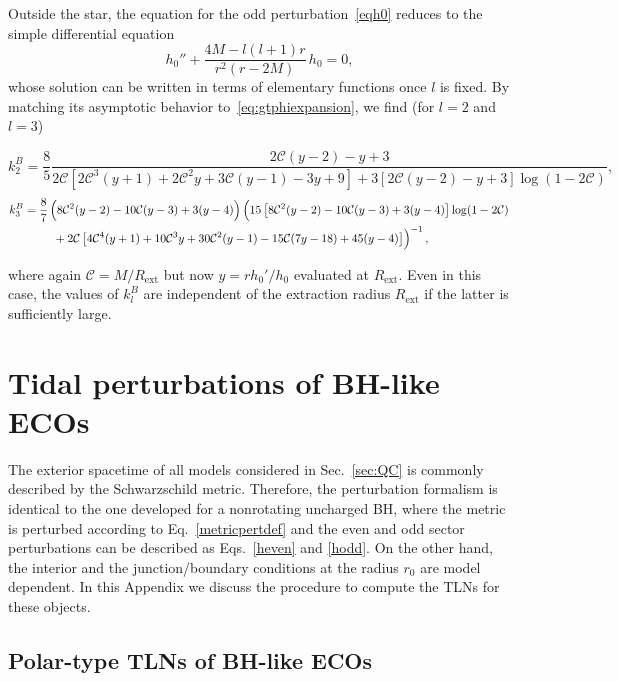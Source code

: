 \documentclass[aps,twocolumn,showpacs,preprintnumbers,nofootinbib,prd,superscriptaddress,groupedaddress,10pt]{revtex4-1}
\def\be{\begin{equation}}
\def\ee{\end{equation}}
\newcommand{\beq}{\begin{eqnarray}}
\newcommand{\eeq}{\end{eqnarray}}
\newcommand{\C}{\mathcal{C}}
\begin{document}
Outside the star, the equation for the odd perturbation~\eqref{eqh0} reduces to the simple differential equation
\be%
h_0'' + \frac{4M - l(l+1)r}{r^2 (r-2M)}\,h_0 = 0,
\ee%
whose solution can be written in terms of elementary functions once $l$ is fixed.
%
By matching its asymptotic behavior to~\eqref{eq:gtphiexpansion}, we find  (for $l=2$ and $l=3$)
\begin{widetext}
\be%
k_2^B = \frac{8}{5}\frac{2\C (y-2)-y+3}{2\C \left[2\C^3 (y+1) + 2\C^2 y + 3\C (y-1)-3 y+9\right] + 3[2\C (y-2)-y+3] \log (1-2\C)},
\ee%
\beq
k_3^B = \frac{8}{7} \left(\vphantom{{(1)}^2} 8\C^2 (y-2)-10\C (y-3)+3 (y-4)\right)
\left(\vphantom{{(1)}^2} 15\left[8 \C^2 (y-2)-10 \C (y-3)+3 (y-4)\right] \log (1-2 \C)\right.\nonumber\\
\left.\vphantom{{(1)}^2} + 2\C \left[4 \C^4 (y+1)+10 \C^3 y+30 \C^2 (y-1)-15 \C (7 y-18)+45 (y-4)\right]\right)^{-1},\qquad\qquad\qquad\quad
\eeq
\end{widetext}
where again $\C=M/R_\text{ext}$ but now $y=rh_0'/h_0$ evaluated at $R_\text{ext}$.
Even in this case, the values of $k_l^B$ are independent of the extraction radius $R_\text{ext}$ if the latter
is sufficiently large.



\section{Tidal perturbations of BH-like ECOs}\label{app:ECOs}

The exterior spacetime of all models considered in Sec.~\ref{sec:QC} is commonly described by the Schwarzschild metric. Therefore, the perturbation formalism is identical to the one developed for a nonrotating uncharged BH, where the metric is perturbed according to Eq.~\eqref{metricpertdef} and the even and odd sector perturbations can be described as Eqs.~\eqref{heven} and \eqref{hodd}. On the other hand, the interior and the junction/boundary conditions at the radius $r_0$ are model dependent. In this Appendix we discuss the procedure to compute the TLNs for these objects.

\subsection{Polar-type TLNs of BH-like ECOs}
\end{document}
